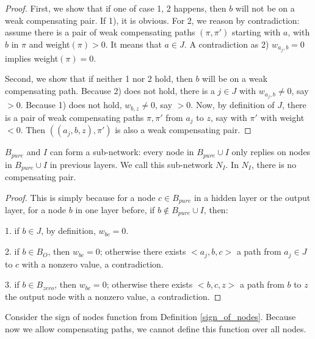 				\begin{proof}
					First, we show that if one of case 1, 2 happens, then $b$ will not be on a weak compensating pair. If 1), it is obvious. For 2, we reason by contradiction: assume there is a pair of weak compensating paths 	$(\pi,\pi')$ starting with $a$, with $b$ in $\pi$ and weight$(\pi) > 0$. It means that $a \in J$. A contradiction as 2) $w_{a_j,b}=0$ implies weight$(\pi)=0$.
					
					Second, we show that if neither 1 nor 2 hold, then $b$ will be on a weak compensating path.
					Because 2) does not hold, there is a $j \in J$ with $w_{a_j,b} \neq 0$, say $>0$.
					Because 1) does not hold, $w_{b,z} \neq 0$, say $>0$.
					Now, by definition of $J$, there is a pair of weak compensating paths $\pi,\pi'$ 
					from $a_j$ to $z$, say with $\pi'$ with weight $<0$.
					Then $((a_j,b,z), \pi')$ is also a weak compensating pair.
				\end{proof}
				
				\begin{lemma}\label{lem:subnetwork}
					$B_{pure}$ and $I$ can form a sub-network: every node in $B_{pure}\cup I$ only replies on nodes in $B_{pure}\cup I$ in previous layers. We call this sub-network $N_I$. In $N_I$, there is no compensating pair.
				\end{lemma}
				
				\begin{proof}
					This is simply because for a node $c\in B_{pure}$ in a hidden layer or the output layer, for a node $b$ in one layer before, if $b\notin B_{pure}\cup I$, then:
					
					1. if $b\in J$, by definition, $w_{bc}=0$.
					
					2. if $b\in B_{O}$, then $w_{bc}=0$; otherwise there exists $<a_j,b,c>$ a path from $a_j\in J$ to $c$ with a nonzero value, a contradiction.
					
					3. if $b\in B_{zero}$, then $w_{bc}=0$; otherwise there exists $<b,c,z>$ a path from $b$ to $z$ the output node with a nonzero value, a contradiction.
				\end{proof}
				
				
				
				Consider the sign of nodes function from Definition \ref{sign_of_nodes}. Because now we allow compensating paths, we cannot define this function over all nodes.
				
				
				

